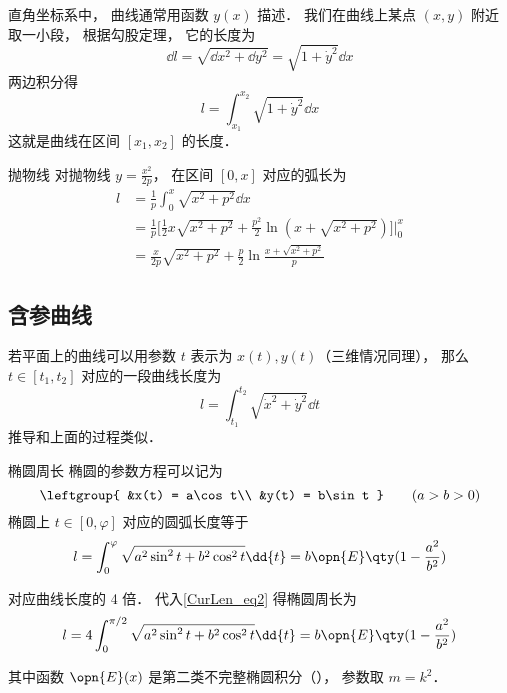 

直角坐标系中， 曲线通常用函数 $y(x)$ 描述． 我们在曲线上某点 $(x, y)$ 附近取一小段， 根据勾股定理， 它的长度为
\begin{equation}
\dd{l} = \sqrt{\dd{x}^2 + \dd{y}^2} = \sqrt{1 + \dot y^2} \dd{x}
\end{equation}
两边积分得
\begin{equation}\label{CurLen_eq1}
l = \int_{x_1}^{x_2} \sqrt{1 + \dot y^2} \dd{x}
\end{equation}
这就是曲线在区间 $[x_1, x_2]$ 的长度．

\begin{example}{抛物线}
对抛物线 $y=\frac{x^2}{2p}$， 在区间 $[0,x]$ 对应的弧长为
\begin{equation}
\begin{aligned}
l& = \frac{1}{p}\int_{0}^{x}\sqrt{x^2+p^2}\dd{x}\\
&=\frac{1}{p}\bigg[\frac{1}{2}x\sqrt{x^2+p^2}+\frac{p^2}{2}\ln(x+\sqrt{x^2+p^2})\bigg]\Bigg\lvert_{0}^{x}\\
&=\frac{x}{2p}\sqrt{x^2+p^2}+\frac{p}{2}\ln\frac{x+\sqrt{x^2+p^2}}{p}
\end{aligned}
\end{equation}
\end{example}

\subsection{含参曲线}
若平面上的曲线可以用参数 $t$ 表示为 $x(t), y(t)$（三维情况同理）， 那么 $t \in [t_1, t_2]$ 对应的一段曲线长度为
\begin{equation}\label{CurLen_eq2}
l = \int_{t_1}^{t_2} \sqrt{\dot x^2 + \dot y^2} \dd{t}
\end{equation}
推导和上面的过程类似．

\begin{example}{椭圆周长}
椭圆的参数方程可以记为
\begin{equation}
\leftgroup{
&x(t) = a\cos t\\
&y(t) = b\sin t
} \qquad
(a > b > 0)
\end{equation}
椭圆上 $t \in [0, \varphi]$ 对应的圆弧长度等于
\begin{equation}
l = \int_0^{\varphi} \sqrt{a^2\sin^2 t + b^2 \cos^2 t} \dd{t} = b \opn{E}\qty(1 - \frac{a^2}{b^2})
\end{equation}

对应曲线长度的 4 倍． 代入\autoref{CurLen_eq2} 得椭圆周长为
\begin{equation}
l = 4\int_0^{\pi/2} \sqrt{a^2\sin^2 t + b^2 \cos^2 t} \dd{t} = b \opn{E}\qty(1 - \frac{a^2}{b^2})
\end{equation}
\end{example}
其中函数 $\opn{E}(x)$ 是第二类不完整椭圆积分（）， 参数取 $m=k^2$．
